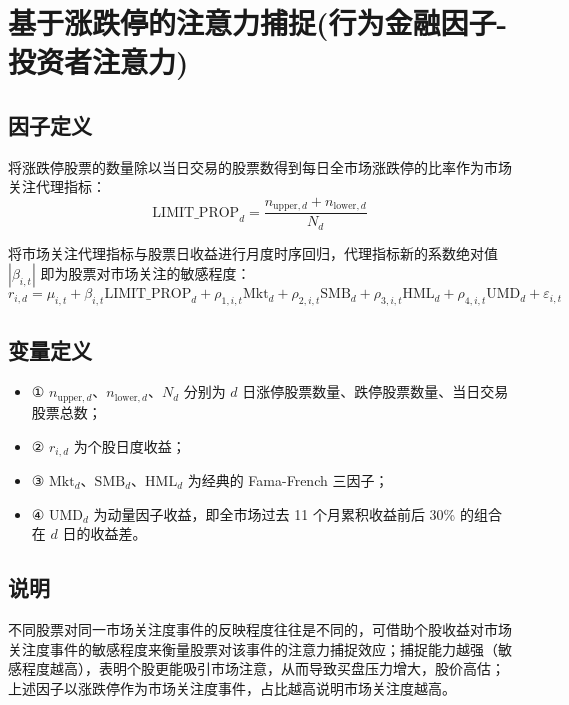 \documentclass{article}
\begin{document}
\section{基于涨跌停的注意力捕捉(行为金融因子-投资者注意力)}

\subsection{因子定义}

将涨跌停股票的数量除以当日交易的股票数得到每日全市场涨跌停的比率作为市场关注代理指标：
\begin{equation}
    \mathrm{LIMIT\_PROP}_d = \frac{n_{\mathrm{upper},d} + n_{\mathrm{lower},d}}{N_d}
\end{equation}

将市场关注代理指标与股票日收益进行月度时序回归，代理指标新的系数绝对值 \(|\beta_{i,t}|\) 即为股票对市场关注的敏感程度：
\begin{equation}
    r_{i,d} = \mu_{i,t} + \beta_{i,t} \mathrm{LIMIT\_PROP}_d + \rho_{1,i,t} \mathrm{Mkt}_d + \rho_{2,i,t} \mathrm{SMB}_d + \rho_{3,i,t} \mathrm{HML}_d + \rho_{4,i,t} \mathrm{UMD}_d + \varepsilon_{i,t}
\end{equation}

\subsection{变量定义}
\begin{itemize}
    \item ① \(n_{\mathrm{upper},d}\)、\(n_{\mathrm{lower},d}\)、\(N_d\) 分别为 \(d\) 日涨停股票数量、跌停股票数量、当日交易股票总数；
    \item ② \(r_{i,d}\) 为个股日度收益；
    \item ③ \(\mathrm{Mkt}_d\)、\(\mathrm{SMB}_d\)、\(\mathrm{HML}_d\) 为经典的 Fama-French 三因子；
    \item ④ \(\mathrm{UMD}_d\) 为动量因子收益，即全市场过去 11 个月累积收益前后 30\% 的组合在 \(d\) 日的收益差。
\end{itemize}

\subsection{说明}
不同股票对同一市场关注度事件的反映程度往往是不同的，可借助个股收益对市场关注度事件的敏感程度来衡量股票对该事件的注意力捕捉效应；捕捉能力越强（敏感程度越高），表明个股更能吸引市场注意，从而导致买盘压力增大，股价高估；上述因子以涨跌停作为市场关注度事件，占比越高说明市场关注度越高。
\end{document}
